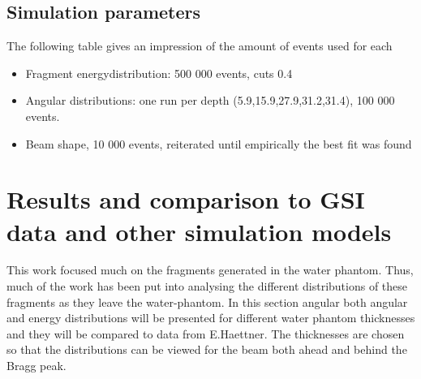 

\subsection{Simulation parameters}
The following table gives an impression of the amount of events used for each
\begin{itemize}
 \item Fragment energydistribution: 500 000 events, cuts 0.4
 \item Angular distributions: one run per depth (5.9,15.9,27.9,31.2,31.4), 100 000 events.
 \item Beam shape, 10 000 events, reiterated until empirically the best fit was found
\end{itemize}

\clearpage
\section{Results and comparison to GSI data and other simulation models}

This work focused much on the fragments generated in the water phantom. Thus, much of the work has been put into analysing the different distributions of these fragments as they leave the water-phantom. In this section angular both angular and energy distributions will be presented for different water phantom thicknesses and they will be compared to data from E.Haettner. The thicknesses are chosen so that the distributions can be viewed for the beam both ahead and behind the Bragg peak.


